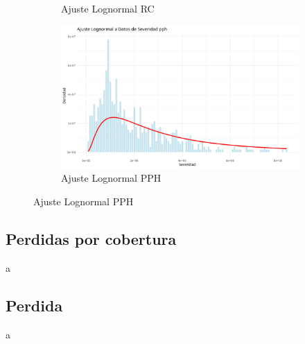 \begin{figure}[H]
\begin{subfigure}{0.45\textwidth}
        \caption{Ajuste Lognormal RC}
    \end{subfigure}
    \hfill
    \begin{subfigure}{0.45\textwidth}
        \includegraphics[width=\textwidth]{../images/ajuste_lognormal_pph.png}
        \caption{Ajuste Lognormal PPH}
    \end{subfigure}
\end{figure}

\subsection{Perdidas por cobertura}
a

\subsection{Perdida}
a